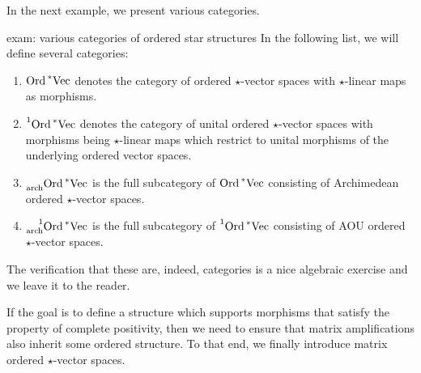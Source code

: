 \documentclass[main.tex]{subfiles}
\begin{document}
In the next example, we present various categories. 
\begin{example}{}{exam: various categories of ordered star structures}
In the following list, we will define several categories: 
\begin{enumerate}
    \item $\text{Ord}\prescript{*}{}{\text{Vec}}$ denotes the category of ordered $\star$-vector spaces with $\star$-linear maps as morphisms. 
    \item $\prescript{1}{}{\text{Ord}\prescript{*}{}{\text{Vec}}}$ denotes the category of unital ordered $\star$-vector spaces with morphisms being $\star$-linear maps which restrict to unital morphisms of the underlying ordered vector spaces. 
    \item $\prescript{}{\text{arch}}{\text{Ord}\prescript{*}{}{\text{Vec}}}$ is the full subcategory of $\text{Ord}\prescript{*}{}{\text{Vec}}$ consisting of Archimedean ordered $\star$-vector spaces. 
    \item $\prescript{1}{\text{arch}}{\text{Ord}\prescript{*}{}{\text{Vec}}}$ is the full subcategory of $\prescript{1}{}{\text{Ord}\prescript{*}{}{\text{Vec}}}$ consisting of AOU ordered $\star$-vector spaces.
\end{enumerate}
The verification that these are, indeed, categories is a nice algebraic exercise and we leave it to the reader. 
\end{example}

If the goal is to define a structure which supports morphisms that satisfy the property of complete positivity, then we need to ensure that matrix amplifications also inherit some ordered structure. To that end, we finally introduce matrix ordered $\star$-vector spaces. 
\end{document}
